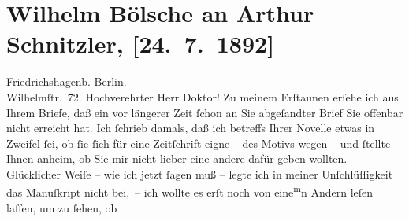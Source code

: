 

         \renewcommand{\erwaehnteOrte}{Orte: Berlin, Friedrichshagen, Peter-Hille-Straße, Wien}
         \renewcommand{\erwaehnteWerke}{Werke: Das Himmelbett}
               \section[Wilhelm Bölsche an Arthur Schnitzler, {[}24. 7. 1892{]}]{ Wilhelm Bölsche an Arthur Schnitzler, {[}24. 7. 1892{]}}\nopagebreak{}\rehead{ }\begin{ledgroupsized}[t]{13cm}\normalsize\beginnumbering \toendnotes[C]{\smallbreak\pagebreak[2]} 
\toendnotes[C]{\smallbreak}\pstart
           \raggedleft{}{\pb}Friedrichshagenb. Berlin.{\\}Wilhelmſtr. 72.\pend
           \pstart\center{}Hochverehrter Herr Doktor!\pend\pstart
           Zu meinem Erſtaunen erſehe ich aus Ihrem Briefe, daß ein vor längerer Zeit ſchon
                    an Sie abgeſandter Brief Sie offenbar nicht erreicht hat. Ich ſchrieb damals,
                    daß ich betreffs Ihrer Novelle etwas \introOben{}in\introOben{} Zweifel ſei, ob ſie ſich für
                    eine Zeitſchrift eigne – des Motivs wegen – und ſtellte Ihnen anheim, ob Sie mir
                    nicht lieber eine andere dafür geben wollten. Glücklicher Weiſe – wie ich jetzt
                    ſagen muß – legte ich in {\pb}meiner Unſchlüſſigkeit
                    das Manuſkript nicht bei, – ich wollte es erſt noch von eine\substVorne{}\textsuperscript{m}\substDazwischen{}n\substHinten{} Andern leſen laſſen, um  zu ſehen, ob

\end{ledgroupsized}
